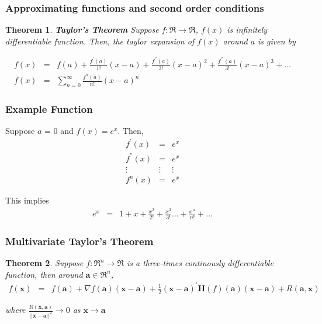 \documentclass{beamer}
\newtheorem{thm}{Theorem}
\numberwithin{equation}{section}
\begin{document}
\begin{frame}
\frametitle{Approximating functions and second order conditions}


\begin{thm}
\textbf{Taylor's Theorem}
Suppose $f:\Re \rightarrow \Re$, $f(x)$ is infinitely differentiable function.  Then, the taylor expansion of $f(x)$ around \alert{$a$} is given by 

\begin{eqnarray}
f(x) & = & f(a) + \frac{f^{'}(a)}{1!} (x- a) + \frac{f^{''}(a)}{2!} (x - a)^2 + \frac{f^{'''}(a)}{3!}(x- a)^3 + \hdots \nonumber \\
f(x) & = & \sum_{n=0}^{\infty } \frac{f^{n} (a) }{n!} (x - a)^n \nonumber
\end{eqnarray}

\end{thm}




\end{frame}


\begin{frame}
\frametitle{Example Function}

Suppose $a$ = 0 and $f(x) = e^{x}$.  Then, 
\begin{eqnarray}
f^{'}(x) & = & e^{x} \nonumber \\
f^{''}(x) & = & e^{x} \nonumber \\
\vdots  & \vdots & \vdots \nonumber \\
f^{n} (x) & = & e^{x} \nonumber 
\end{eqnarray}

This implies
\begin{eqnarray}
e^{x} & = & 1 + x + \frac{x^{2}}{2!} + \frac{x^3}{3!} \hdots + \frac{x^{n}}{n!} + \hdots \nonumber \end{eqnarray}

\end{frame}



\begin{frame}
\frametitle{Multivariate Taylor's Theorem}

\begin{thm} 

Suppose $f:\Re^{n} \rightarrow \Re$ is a three-times continously differentiable function, then around $\boldsymbol{a}\in \Re^{n}$, 
\begin{eqnarray}
f(\boldsymbol{x}) & = & f(\boldsymbol{a} ) + \nabla f(\boldsymbol{a}) (\boldsymbol{x} - \boldsymbol{a} )  + \frac{1}{2}(\boldsymbol{x} - \boldsymbol{a} )^{'} \textbf{H} (f)(\boldsymbol{a}) (\boldsymbol{x} - \boldsymbol{a} )  + R(\boldsymbol{a}, \boldsymbol{x}) \nonumber 
\end{eqnarray}

where $\frac{R(\boldsymbol{x}, \boldsymbol{a})}{||\boldsymbol{x} - \boldsymbol{a}||^2} \rightarrow 0 $ as $\boldsymbol{x} \rightarrow \boldsymbol{a}$

\end{thm}


\end{frame}
\end{document}
